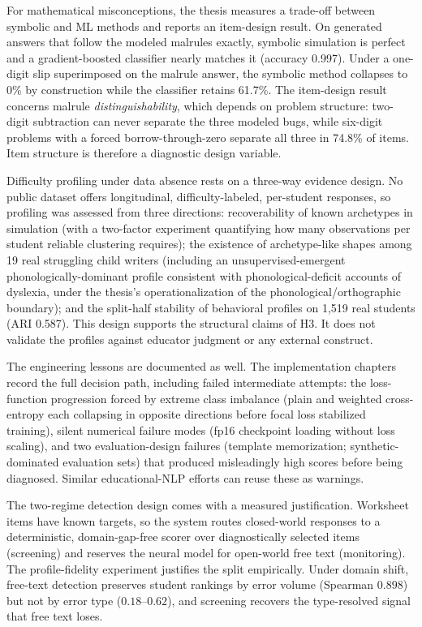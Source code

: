 For mathematical misconceptions, the thesis measures a trade-off between symbolic and ML methods and reports an item-design result. On generated answers that follow the modeled malrules exactly, symbolic simulation is perfect and a gradient-boosted classifier nearly matches it (accuracy 0.997). Under a one-digit slip superimposed on the malrule answer, the symbolic method collapses to 0\% by construction while the classifier retains 61.7\%. The item-design result concerns malrule \emph{distinguishability}, which depends on problem structure: two-digit subtraction can never separate the three modeled bugs, while six-digit problems with a forced borrow-through-zero separate all three in 74.8\% of items. Item structure is therefore a diagnostic design variable.

Difficulty profiling under data absence rests on a three-way evidence design. No public dataset offers longitudinal, difficulty-labeled, per-student responses, so profiling was assessed from three directions: recoverability of known archetypes in simulation (with a two-factor experiment quantifying how many observations per student reliable clustering requires); the existence of archetype-like shapes among 19 real struggling child writers (including an unsupervised-emergent phonologically-dominant profile consistent with phonological-deficit accounts of dyslexia, under the thesis's operationalization of the phonological/orthographic boundary); and the split-half stability of behavioral profiles on 1{,}519 real students (ARI 0.587). This design supports the structural claims of H3. It does not validate the profiles against educator judgment or any external construct.

The engineering lessons are documented as well. The implementation chapters record the full decision path, including failed intermediate attempts: the loss-function progression forced by extreme class imbalance (plain and weighted cross-entropy each collapsing in opposite directions before focal loss stabilized training), silent numerical failure modes (fp16 checkpoint loading without loss scaling), and two evaluation-design failures (template memorization; synthetic-dominated evaluation sets) that produced misleadingly high scores before being diagnosed. Similar educational-NLP efforts can reuse these as warnings.

The two-regime detection design comes with a measured justification. Worksheet items have known targets, so the system routes closed-world responses to a deterministic, domain-gap-free scorer over diagnostically selected items (screening) and reserves the neural model for open-world free text (monitoring). The profile-fidelity experiment justifies the split empirically. Under domain shift, free-text detection preserves student rankings by error volume (Spearman $0.898$) but not by error type ($0.18$--$0.62$), and screening recovers the type-resolved signal that free text loses.

